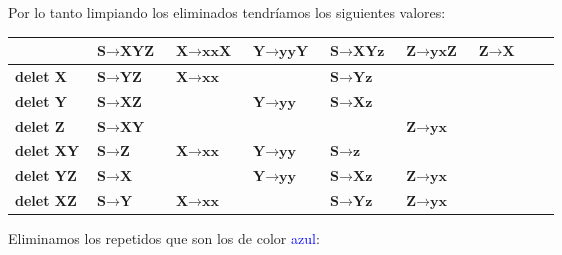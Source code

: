 \newpage

Por lo tanto limpiando los eliminados tendríamos los siguientes valores:

\begin{table}[H]
	\centering
	\begin{tabular}{|m{2cm}||m{1.8cm}|m{1.8cm}|m{1.8cm}|m{1.8cm}|m{1.8cm}|m{1.8cm}|m{1.8cm}|m{1.8cm}|}
		\hline
		& $ \textbf{S} \rightarrow \textbf{XYZ} $ & $ \textbf{X} \rightarrow \textbf{xxX} $ & $ \textbf{Y} \rightarrow \textbf{yyY} $ & $ \textbf{S} \rightarrow \textbf{XYz} $ & $ \textbf{Z} \rightarrow \textbf{yxZ} $ & $ \textbf{Z} \rightarrow \textbf{X} $ \\
		\hline \hline
		\textbf{delet X} & $ \textbf{S} \rightarrow \textbf{YZ} $ & $ \textbf{X} \rightarrow \textbf{xx} $ &  & $ \textbf{S} \rightarrow \textbf{Yz} $ &  &  \\
		\hline
		\textbf{delet Y} & $ \textbf{S} \rightarrow \textbf{XZ} $ &  & $ \textbf{Y} \rightarrow \textbf{yy} $ & $ \textbf{S} \rightarrow \textbf{Xz} $ &  &  \\
		\hline
		\textbf{delet Z} & $ \textbf{S} \rightarrow \textbf{XY} $ &  &  &  & $ \textbf{Z} \rightarrow \textbf{yx} $ &  \\
		\hline
		\textbf{delet XY} & $ \textbf{S} \rightarrow \textbf{Z} $ & $ \textbf{X} \rightarrow \textbf{xx} $ & $ \textbf{Y} \rightarrow \textbf{yy} $ & $ \textbf{S} \rightarrow \textbf{z} $ &  &  \\
		\hline
		\textbf{delet YZ} & $ \textbf{S} \rightarrow \textbf{X} $ &  & $ \textbf{Y} \rightarrow \textbf{yy} $ & $ \textbf{S} \rightarrow \textbf{Xz} $ & $ \textbf{Z} \rightarrow \textbf{yx} $ &  \\
		\hline
		\textbf{delet XZ} & $ \textbf{S} \rightarrow \textbf{Y} $ & $ \textbf{X} \rightarrow \textbf{xx} $ &  & $ \textbf{S} \rightarrow \textbf{Yz} $ & $ \textbf{Z} \rightarrow \textbf{yx} $ &  \\
		\hline
	\end{tabular}
	\label{fig:tabla-prac-3A}
\end{table}

Eliminamos los repetidos que son los de color \textcolor{blue}{azul}: 

